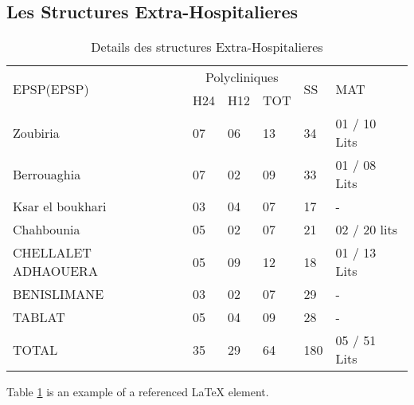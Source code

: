 \newpage
\subsection{Les Structures Extra-Hospitalieres}
\begin{table}[h!]
\begin{center}
\begin{tabular}{|p{5cm}|p{1cm}|p{1cm}|p{1cm}|p{1cm}|p{3cm}|}
\hline
\hline
\multirow{2}{*}{EPSP(EPSP)} &\multicolumn{3}{c|}{Polycliniques}&\multirow{2}{*}{SS} &\multirow{2}{*}{MAT} \\
                            \cline{2-4}
                            &H24 &H12  &TOT                     &                    &                     \\

\hline
Zoubiria	          &07	 &06	&13	 &34	&01 / 10 Lits\\
Berrouaghia	        &07	 &02	&09	 &33	&01 / 08 Lits\\
Ksar el boukhari	  &03	 &04	&07	 &17	&-           \\
Chahbounia	        &05	 &02	&07	 &21	&02 / 20 lits\\
CHELLALET ADHAOUERA	&05	 &09	&12	 &18	&01 / 13 Lits\\
BENISLIMANE	        &03	 &02	&07	 &29	&-           \\
TABLAT	            &05	 &04	&09	 &28	&-            \\
\hline
TOTAL	              &35	 &29	&64	 &180 &05 / 51 Lits\\
\hline

\end{tabular}
\end{center}
\caption{Details des structures Extra-Hospitalieres}
\label{table:3}
\end{table}
Table \ref{table:3} is an example of a referenced \LaTeX{} element.

\newpage
